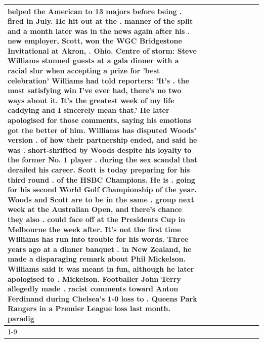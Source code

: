\begin{table}[H]
\begin{tabular}{lllrlllll}
helped the American to 13 majors before being . fired in July. He hit out at the . manner of the split and a month later was in the news again after his . new employer, Scott, won the WGC Bridgestone Invitational at Akron, . Ohio. Centre of storm: Steve Williams stunned guests at a gala dinner with a racial slur when accepting a prize for 'best celebration' Williams had told reporters: 'It's . the most satisfying win I've ever had, there's no two ways about it. It's the greatest week of my life caddying and I sincerely mean that.' He later apologised for those comments, saying his emotions got the better of him. Williams has disputed Woods' version . of how their partnership ended, and said he was . short-shrifted by Woods despite his loyalty to the former No. 1 player . during the sex scandal that derailed his career. Scott is today preparing for his third round . of the HSBC Champions. He is . going for his second World Golf Championship of the year. Woods and Scott are to be in the same . group next week at the Australian Open, and there's chance they also . could face off at the Presidents Cup in Melbourne the week after. It's not the first time Williams has run into trouble for his words. Three years ago at a dinner banquet . in New Zealand, he made a disparaging remark about Phil Mickelson. Williams said it was meant in fun, although he later apologised to . Mickelson. Footballer John Terry allegedly made . racist comments toward Anton Ferdinand during Chelsea's 1-0 loss to . Queens Park Rangers in a Premier League loss last month. paradig \\
\cline{1-9}

\end{tabular}
\end{table}
